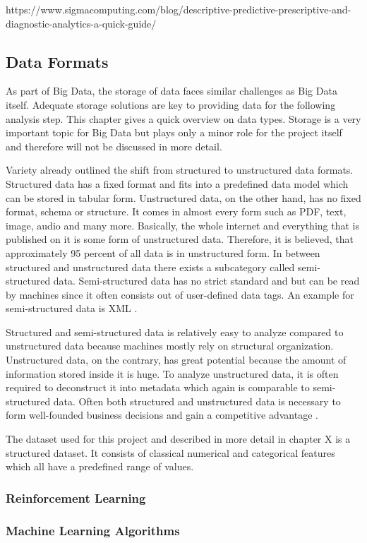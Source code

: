 https://www.sigmacomputing.com/blog/descriptive-predictive-prescriptive-and-diagnostic-analytics-a-quick-guide/

\subsection{Data Formats}

As part of Big Data, the storage of data faces similar challenges as Big Data itself. Adequate 
storage solutions are key to providing data for the following analysis step. This chapter gives 
a quick overview on data types. Storage is a very important topic for Big Data but plays only a 
minor role for the project itself and therefore will not be discussed in more detail.  

Variety already outlined the shift from structured to unstructured data formats. Structured data 
has a fixed format and fits into a predefined data model which can be stored in tabular form. 
Unstructured data, on the other hand, has no fixed format, schema or structure.  It comes in 
almost every form such as PDF, text, image, audio and many more. Basically, the whole internet 
and everything that is published on it is some form of unstructured data. Therefore, it is 
believed, that approximately 95 percent of all data is in unstructured form. In between structured 
and unstructured data there exists a subcategory called semi-structured data. Semi-structured 
data has no strict standard and but can be read by machines since it often consists out of 
user-defined data tags. An example for semi-structured data is XML \cite[p.2f]{Tanwar2015}. 

Structured and semi-structured data is relatively easy to analyze compared to unstructured data 
because machines mostly rely on structural organization. Unstructured data, on the contrary, has 
great potential because the amount of information stored inside it is huge. To analyze 
unstructured data, it is often required to deconstruct it into metadata which again is comparable 
to semi-structured data. Often both structured and unstructured data is necessary to form 
well-founded business decisions and gain a competitive advantage \cite[p.2f]{Tanwar2015}. 

The dataset used for this project and described in more detail in chapter X is a structured 
dataset. It consists of classical numerical and categorical features which all have a predefined 
range of values. 

\subsubsection{Reinforcement Learning}

\subsubsection{Machine Learning Algorithms}
